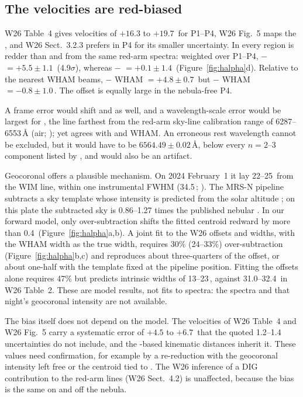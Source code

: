 \subsection{The \texorpdfstring{\Ha{}}{H-alpha} velocities are red-biased}\label{sec:halpha}

W26 Table~4 gives \Ha{} velocities of $+16.3$ to $+19.7$\,\kms{} for P1--P4, W26 Fig.~5 maps the \Ha{} \vlsr, and W26 Sect.~3.2.3 prefers \Ha{} in P4 for its smaller uncertainty. In every region \Ha{} is redder than \Nii{} and \Sii{} from the same red-arm spectra: weighted over P1--P4, \Ha{} $-$ \Nii{} $=+5.5\pm1.1$\,\kms{} (4.9$\sigma$), whereas \Nii{} $-$ \Sii{} $=+0.1\pm1.4$\,\kms{} (Figure~\ref{fig:halpha}d). Relative to the nearest WHAM beams, \Ha{} $-$ WHAM $=+4.8\pm0.7$\,\kms{} but \Nii{} $-$ WHAM $=-0.8\pm1.0$\,\kms. The offset is equally large in the nebula-free P4.

A frame error would shift \Nii{} and \Sii{} as well, and a wavelength-scale error would be largest for \Sii, the line farthest from the red-arm sky-line calibration range of 6287--6553\,\AA{} (air; \citealt{Ren2021,Wu2022}); yet \Sii{} agrees with \Nii{} and WHAM. An erroneous \Ha{} rest wavelength cannot be excluded, but it would have to be $6564.49\pm0.02$\,\AA, below every  $n=2$--3 component listed by \citet{Kramida2024}, and would also be an artifact.

Geocoronal \Ha{} offers a plausible mechanism. On 2024 February~1 it lay 22--25\,\kms{} from the WIM line, within one instrumental FWHM (34.5\,\kms; \citealt{Zhang2021}). The MRS-N pipeline subtracts a sky template whose intensity is predicted from the solar altitude \citep{Zhang2021,Wu2022}; on this plate the subtracted sky is 0.86--1.27 times the published nebular \Ha. In our forward model, only over-subtraction shifts the fitted centroid redward by more than 0.4\,\kms{} (Figure~\ref{fig:halpha}a,b). A joint fit to the W26 \Ha{} offsets and widths, with the WHAM width as the true width, requires 30\% (24--33\%) over-subtraction (Figure~\ref{fig:halpha}b,c) and reproduces about three-quarters of the offset, or about one-half with the template fixed at the pipeline position. Fitting the offsets alone requires 47\% but predicts intrinsic widths of 13--23\,\kms, against 31.0--32.4\,\kms{} in W26 Table~2. These are model results, not fits to spectra: the spectra and that night's geocoronal intensity are not available.

The bias itself does not depend on the model. The \Ha{} velocities of W26 Table~4 and W26 Fig.~5 carry a systematic error of $+4.5$ to $+6.7$\,\kms{} that the quoted 1.2--1.4\,\kms{} uncertainties do not include, and the \Ha-based kinematic distances inherit it. These values need confirmation, for example by a re-reduction with the geocoronal intensity left free or the \Ha{} centroid tied to \Nii. The W26 inference of a DIG contribution to the red-arm lines (W26 Sect.~4.2) is unaffected, because the bias is the same on and off the nebula.


